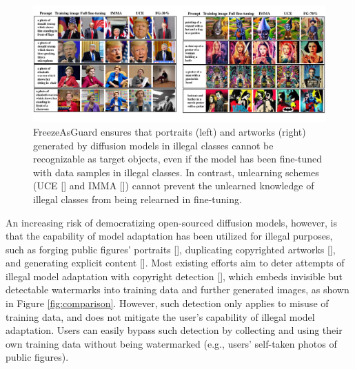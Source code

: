 \documentclass{article}
\begin{document}
\begin{figure}
	\centering
	\vspace{-0.15in}
	\includegraphics[width=1\linewidth]{figures/main_example1.pdf}
	\vspace{-0.35in}
	\caption{FreezeAsGuard ensures that portraits (left) and artworks (right) generated by diffusion models in illegal classes cannot be recognizable as target objects, even if the model has been fine-tuned with data samples in illegal classes. In contrast, unlearning schemes (UCE [] and IMMA []) cannot prevent the unlearned knowledge of illegal classes from being relearned in fine-tuning.}
	\label{fig:illustrative_examples}
\end{figure}
An increasing risk of democratizing open-sourced diffusion models, however, is that the capability of model adaptation has been utilized for illegal purposes, such as forging public figures' portraits [], duplicating copyrighted artworks [], and generating explicit content []. Most existing efforts aim to deter attempts of illegal model adaptation with copyright detection [], which embeds invisible but detectable watermarks into training data and further generated images, as shown in Figure \ref{fig:comparison}. However, such detection only applies to misuse of training data, and does not mitigate the user's capability of illegal model adaptation. Users can easily bypass such detection by collecting and using their own training data without being watermarked (e.g., users' self-taken photos of public figures).
\end{document}
